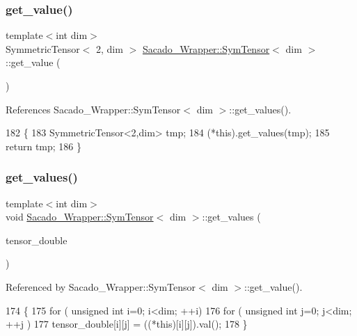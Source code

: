 \subsubsection{\texorpdfstring{get\+\_\+value()}{get\_value()}}
{\footnotesize\ttfamily template$<$int dim$>$ \\
Symmetric\+Tensor$<$ 2, dim $>$ \hyperlink{classSacado__Wrapper_1_1SymTensor}{Sacado\+\_\+\+Wrapper\+::\+Sym\+Tensor}$<$ dim $>$\+::get\+\_\+value (\begin{DoxyParamCaption}{ }\end{DoxyParamCaption})}



References Sacado\+\_\+\+Wrapper\+::\+Sym\+Tensor$<$ dim $>$\+::get\+\_\+values().


\begin{DoxyCode}
182     \{
183         SymmetricTensor<2,dim> tmp;
184         (*this).get\_values(tmp);
185         \textcolor{keywordflow}{return} tmp;
186     \}
\end{DoxyCode}
\mbox{\label{classSacado__Wrapper_1_1SymTensor_afbab1ce0f846f026f5bd8b449180b5e9}} 
\subsubsection{\texorpdfstring{get\+\_\+values()}{get\_values()}}
{\footnotesize\ttfamily template$<$int dim$>$ \\
void \hyperlink{classSacado__Wrapper_1_1SymTensor}{Sacado\+\_\+\+Wrapper\+::\+Sym\+Tensor}$<$ dim $>$\+::get\+\_\+values (\begin{DoxyParamCaption}\item[{Symmetric\+Tensor$<$ 2, dim $>$ \&}]{tensor\+\_\+double }\end{DoxyParamCaption})}



Referenced by Sacado\+\_\+\+Wrapper\+::\+Sym\+Tensor$<$ dim $>$\+::get\+\_\+value().


\begin{DoxyCode}
174     \{
175         \textcolor{keywordflow}{for} ( \textcolor{keywordtype}{unsigned} \textcolor{keywordtype}{int} i=0; i<dim; ++i)
176             \textcolor{keywordflow}{for} ( \textcolor{keywordtype}{unsigned} \textcolor{keywordtype}{int} j=0; j<dim; ++j )
177                 tensor\_double[i][j] = ((*\textcolor{keyword}{this})[i][j]).val();
178     \}
\end{DoxyCode}
\mbox{\label{classSacado__Wrapper_1_1SymTensor_acbad579d5ead9e96ff46aa15d9b5aef4}} 
